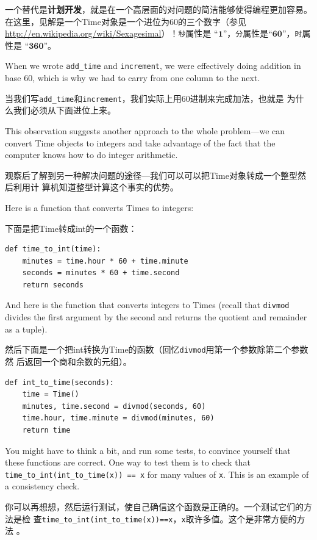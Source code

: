 \documentclass[10pt]{book}
\begin{document}
\begin{CJK}{UTF8}{gbsn}
一个替代是{\bf 计划开发}，就是在一个高层面的对问题的简洁能够使得编程更加容易。
在这里，见解是一个Time对象是一个进位为60的三个数字（参见
\url{http://en.wikipedia.org/wiki/Sexagesimal}）！{\tt 秒}属性是
``$\mathbf{1}$''，{\tt 分}属性是``$\mathbf{60}$''，{\tt 时}属性是
``$\mathbf{360}$''。

When we wrote \verb"add_time" and {\tt increment}, we were effectively
doing addition in base 60, which is why we had to carry from one
column to the next.

当我们写\verb"add_time"和{\tt increment}，我们实际上用60进制来完成加法，也就是
为什么我们必须从下面进位上来。

This observation suggests another approach to the whole problem---we
can convert Time objects to integers and take advantage of the fact
that the computer knows how to do integer arithmetic.  

观察后了解到另一种解决问题的途径---我们可以可以把Time对象转成一个整型然后利用计
算机知道整型计算这个事实的优势。

Here is a function that converts Times to integers:

下面是把Time转成int的一个函数：

\begin{verbatim}
def time_to_int(time):
    minutes = time.hour * 60 + time.minute
    seconds = minutes * 60 + time.second
    return seconds
\end{verbatim}
%
And here is the function that converts integers to Times
(recall that {\tt divmod} divides the first argument by the second
and returns the quotient and remainder as a tuple).

然后下面是一个把int转换为Time的函数（回忆{\tt divmod}用第一个参数除第二个参数然
后返回一个商和余数的元组）。

\begin{verbatim}
def int_to_time(seconds):
    time = Time()
    minutes, time.second = divmod(seconds, 60)
    time.hour, time.minute = divmod(minutes, 60)
    return time
\end{verbatim}
%
You might have to think a bit, and run some tests, to convince
yourself that these functions are correct.  One way to test them is to
check that \verb"time_to_int(int_to_time(x)) == x" for many values of
{\tt x}.  This is an example of a consistency check.

你可以再想想，然后运行测试，使自己确信这个函数是正确的。一个测试它们的方法是检
查\verb"time_to_int(int_to_time(x))==x"，{\tt x}取许多值。这个是非常方便的方法
。


\end{CJK}
\end{document}
